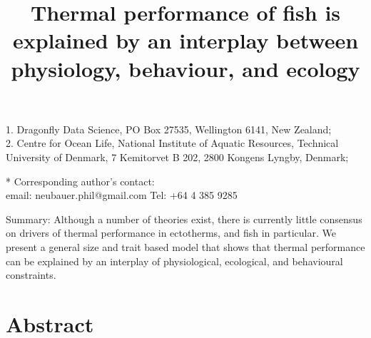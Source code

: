 \documentclass[11pt]{article}\usepackage[]{graphicx}\usepackage[]{color,soul}
\title{Thermal performance of fish is explained by an interplay between physiology, behaviour, and ecology}
\author{Philipp Neubauer^{1,\ast}$ \\ 
         Ken H. Andersen$^{2}$}
\date{}
\begin{document}
\maketitle

\noindent{} 1. Dragonfly Data Science, PO Box 27535, Wellington 6141, New Zealand;\\
% 
\noindent{} 2. Centre for Ocean Life, National Institute of Aquatic Resources, Technical University of Denmark, 7 Kemitorvet B 202, 2800 Kongens Lyngby, Denmark;\\


\bigskip

\noindent{} * Corresponding author's contact: \\
email: neubauer.phil@gmail.com 
Tel: +64 4 385 9285\\

\bigskip

Summary: Although a number of theories exist, there is currently little consensus on drivers of thermal performance in ectotherms, and fish in particular. We present a general size and trait based model that shows that thermal performance can be explained by an interplay of physiological, ecological, and behavioural constraints.

\linenumbers{}
\modulolinenumbers[3]

\newpage{}

\section*{Abstract}
\end{document}
